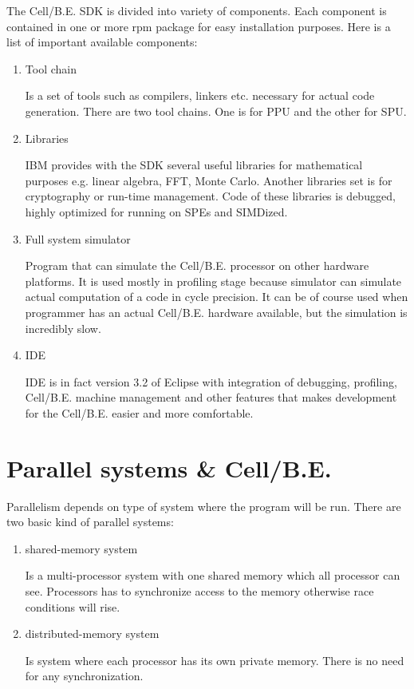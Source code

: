 The \mbox{Cell/B.E.} SDK is divided into variety of components.
Each component is contained in one or more rpm package for easy installation purposes.
Here is a list of important available components:
\begin{enumerate}
  \item {Tool chain}
  \par
  Is a set of tools such as compilers, linkers etc. necessary for actual code generation.
There are two tool chains.
One is for PPU and the other for SPU.

  \item {Libraries}
  \par
  IBM provides with the SDK several useful libraries for mathematical purposes e.g. linear algebra, FFT, Monte Carlo.
Another libraries set is for cryptography or run-time management.
Code of these libraries is debugged, highly optimized for running on SPEs and SIMDized.

  \item {Full system simulator}
  \par
  Program that can simulate the \mbox{Cell/B.E.} processor on other hardware platforms.
It is used mostly in profiling stage because simulator can simulate actual computation of a code in cycle precision.
It can be of course used when programmer has an actual \mbox{Cell/B.E.} hardware available, but the simulation is incredibly slow.

  \item {IDE}
  \par
  IDE is in fact version 3.2 of Eclipse with integration of debugging, profiling, \mbox{Cell/B.E.} machine management and other features that makes development for the \mbox{Cell/B.E.} easier and more comfortable.
\end{enumerate}


\section{Parallel systems \& \mbox{Cell/B.E.}}

Parallelism depends on type of system where the program will be run.
There are two basic kind of parallel systems:
\begin{enumerate}
\item {shared-memory system}
\par
Is a multi-processor system with one shared memory which all processor can see.
Processors has to synchronize access to the memory otherwise race conditions will rise.

\item {distributed-memory system}
\par
Is system where each processor has its own private memory.
There is no need for any synchronization.
\end{enumerate}

